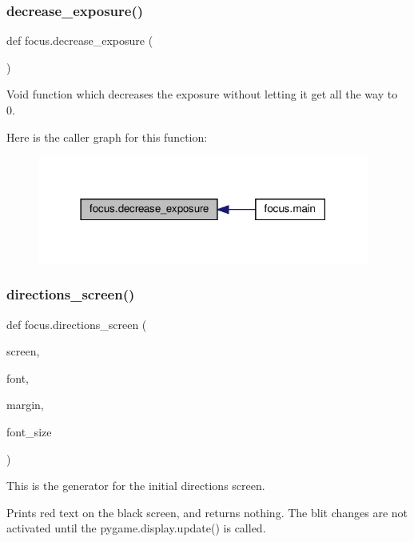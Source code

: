 \subsubsection{\texorpdfstring{decrease\+\_\+exposure()}{decrease\_exposure()}}
{\footnotesize\ttfamily def focus.\+decrease\+\_\+exposure (\begin{DoxyParamCaption}{ }\end{DoxyParamCaption})}



Void function which decreases the exposure without letting it get all the way to 0. 

Here is the caller graph for this function\+:
\nopagebreak
\begin{figure}[H]
\begin{center}
\leavevmode
\includegraphics[width=309pt]{namespacefocus_a8fb78b10ef91e414ac6707d45fcd0e5b_icgraph}
\end{center}
\end{figure}
\mbox{\label{namespacefocus_a7c48f36dcbc8deec93ed615925469176}} 
\subsubsection{\texorpdfstring{directions\+\_\+screen()}{directions\_screen()}}
{\footnotesize\ttfamily def focus.\+directions\+\_\+screen (\begin{DoxyParamCaption}\item[{}]{screen,  }\item[{}]{font,  }\item[{}]{margin,  }\item[{}]{font\+\_\+size }\end{DoxyParamCaption})}



This is the generator for the initial directions screen. 

Prints red text on the black screen, and returns nothing. The blit changes are not activated until the pygame.\+display.\+update() is called.



